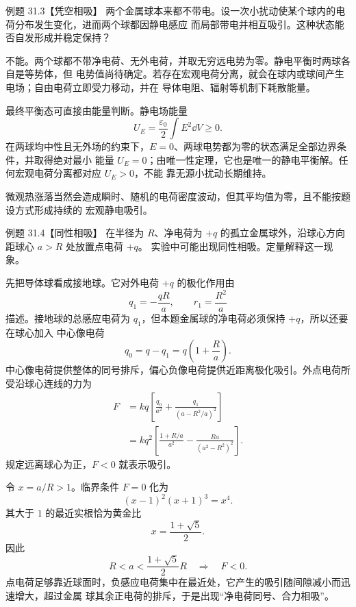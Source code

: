 \Needspace{0.3\textheight}
\begin{origexamplebox}{例题 31.3【凭空相吸】}
两个金属球本来都不带电。设一次小扰动使某个球内的电荷分布发生变化，进而两个球都因静电感应
而局部带电并相互吸引。这种状态能否自发形成并稳定保持？
\end{origexamplebox}

\begin{xesolution}
不能。两个球都不带净电荷、无外电荷，并取无穷远电势为零。静电平衡时两球各自是等势体，但
电势值尚待确定。若存在宏观电荷分离，就会在球内或球间产生电场；自由电荷立即受力移动，并在
导体电阻、辐射等机制下耗散能量。

最终平衡态可直接由能量判断。静电场能量
\[
  U_E=\frac{\varepsilon_0}{2}\int E^2\dd V\ge0.
\]
在两球均中性且无外场的约束下，$E=0$、两球电势都为零的状态满足全部边界条件，并取得绝对最小
能量 $U_E=0$；由唯一性定理，它也是唯一的静电平衡解。任何宏观电荷分离都对应 $U_E>0$，不能
靠无源小扰动长期维持。

微观热涨落当然会造成瞬时、随机的电荷密度波动，但其平均值为零，且不能按题设方式形成持续的
宏观静电吸引。
\end{xesolution}

\Needspace{0.38\textheight}
\begin{origexamplebox}{例题 31.4【同性相吸】}
在半径为 $R$、净电荷为 $+q$ 的孤立金属球外，沿球心方向距球心 $a>R$ 处放置点电荷 $+q$。
实验中可能出现同性相吸。定量解释这一现象。
\end{origexamplebox}

\begin{xesolution}
先把导体球看成接地球。它对外电荷 $+q$ 的极化作用由
\[
  q_1=-\frac{qR}{a},\qquad r_1=\frac{R^2}{a}
\]
描述。接地球的总感应电荷为 $q_1$，但本题金属球的净电荷必须保持 $+q$，所以还要在球心加入
中心像电荷
\[
  q_0=q-q_1=q\left(1+\frac Ra\right).
\]
中心像电荷提供整体的同号排斥，偏心负像电荷提供近距离极化吸引。外点电荷所受沿球心连线的力为
\begin{align*}
  F&=kq\left[\frac{q_0}{a^2}
  +\frac{q_1}{(a-R^2/a)^2}\right]\\
  &=\boxed{kq^2\left[
  \frac{1+R/a}{a^2}-\frac{Ra}{(a^2-R^2)^2}\right]}.
\end{align*}
规定远离球心为正，$F<0$ 就表示吸引。

令 $x=a/R>1$。临界条件 $F=0$ 化为
\[
  (x-1)^2(x+1)^3=x^4.
\]
其大于 $1$ 的最近实根恰为黄金比
\[
  x=\frac{1+\sqrt5}{2}.
\]
因此
\begin{equation}
  \boxed{R<a<\frac{1+\sqrt5}{2}R\quad\Longrightarrow\quad F<0}.
\end{equation}
点电荷足够靠近球面时，负感应电荷集中在最近处，它产生的吸引随间隙减小而迅速增大，超过金属
球其余正电荷的排斥，于是出现“净电荷同号、合力相吸”。

\isolatedSphereDiagram
\end{xesolution}


